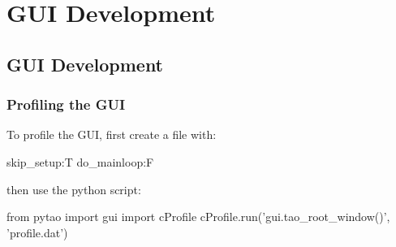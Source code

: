 \chapter{GUI Development}

\section{GUI Development} 
\label{s:develop}

\subsection{Profiling the GUI} 
\label{s:prfile}

To profile the GUI, first create a  file with:
\begin{example}
  skip_setup:T
  do_mainloop:F
\end{example}

then use the python script:
\begin{example}
  from pytao import gui
  import cProfile
  cProfile.run('gui.tao_root_window()', 'profile.dat')
\end{example}

